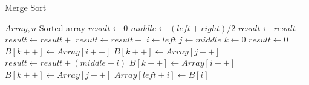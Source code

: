 \documentclass[paper=a4, fontsize=11pt,twoside]{scrartcl}		%
\begin{document}
\renewcommand{\algorithmicrequire}{\textbf{Input:}}
\renewcommand{\algorithmicensure}{\textbf{Output:}}
    \begin{algorithm}
        \caption{Merge Sort}
        \begin{algorithmic}[1]
            \Require $Array,n$
            \Ensure Sorted array
                \State $result \gets 0$
                    \State $middle \gets (left + right) / 2$
                    \State $result \gets result +$ 
                    \State $result \gets result +$ 
                    \State $result \gets result +$ 
                \EndIf
                \State {}
            \EndFunction
            \State
                \State $i\gets left$
                \State $j\gets middle$
                \State $k\gets 0$
                \State $result \gets 0$
                        \State $B[k++]\gets Array[i++]$
                    \Else
                        \State $B[k++] \gets Array[j++]$
                        \State $result \gets result + (middle - i)$
                    \EndIf
                \EndWhile
                    \State $B[k++] \gets Array[i++]$
                \EndWhile
                    \State $B[k++] \gets Array[j++]$
                \EndWhile
                    \State $Array[left + i] \gets B[i]$
                \EndFor
                \State {}
            \EndFunction
        \end{algorithmic}
    \end{algorithm}
    
\end{document}
